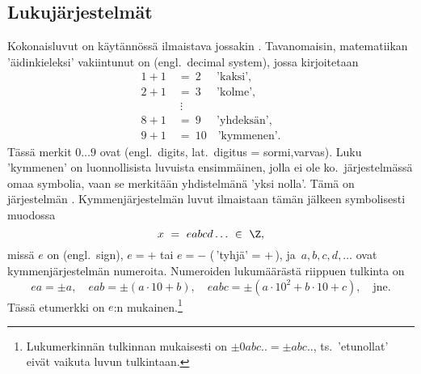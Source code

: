 \subsection*{Lukujärjestelmät}
Kokonaisluvut on käytännössä ilmaistava jossakin . Tavanomaisin, 
matematiikan 'äidinkieleksi' vakiintunut on  (engl.\ decimal system), 
jossa kirjoitetaan
\begin{align*}
1+1\ &=\ 2 \quad\ \,\text{'kaksi'}, \\
2+1\ &=\ 3 \quad\ \,\text{'kolme'}, \\
     &\ \vdots \\
8+1\ &=\ 9 \quad\ \,\text{'yhdeksän'}, \\
9+1\ &=\ 10 \quad \text{'kymmenen'}.
\end{align*}
Tässä merkit $0 \ldots 9$ ovat  (engl.\ digits, lat.\ 
digitus = sormi,varvas). Luku 'kymmenen' on luonnollisista luvuista ensimmäinen, jolla ei ole 
ko.\ järjestelmässä omaa symbolia, vaan se merkitään yhdistelmänä 'yksi nolla'. Tämä on 
järjestelmän \kor{kantaluku}. Kymmenjärjestelmän luvut ilmaistaan tämän jälkeen symbolisesti 
muodossa 
\[
x\ =\ eabcd \ldots\ \in\ \Z,
\]
missä $e$ on  (engl.\ sign), $e=+$ tai $e=-$ (\,'tyhjä' = $+$\,), ja 
$\,a,b,c,d, \ldots$ ovat kymmenjärjestelmän numeroita. Numeroiden lukumäärästä riippuen tulkinta
on
\[
ea = \pm a, \quad eab = \pm (a \cdot 10 + b), \quad 
                 eabc = \pm(a \cdot 10^2 + b \cdot 10 + c), \quad \text{jne.}
\]
Tässä etumerkki on $e$:n mukainen.\footnote[2]{Lukumerkinnän tulkinnan mukaisesti on
$\pm 0abc .. = \pm abc ..$, ts.\ 'etunollat' eivät vaikuta luvun tulkintaan.} 

